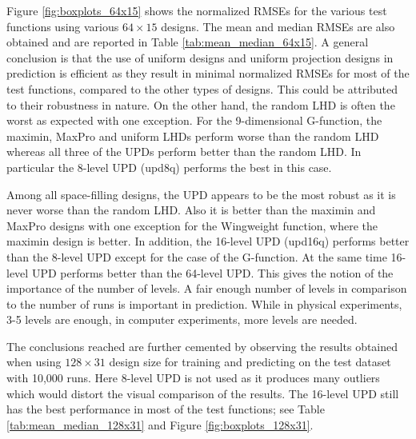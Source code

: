 \documentclass [PhD] {package/uclathes}
\begin{document}
Figure \ref{fig:boxplots_64x15} shows the normalized RMSEs for the various test functions using various $64\times15$ designs. The mean and median RMSEs are also obtained and are reported in Table \ref{tab:mean_median_64x15}.
A general conclusion is that the use of uniform designs and uniform projection designs in prediction is efficient as they result in minimal normalized RMSEs for most of the test functions, compared to the other types of designs. This could be attributed to their robustness in nature. On the other hand, the random LHD is often the worst as expected with one exception. For the 9-dimensional G-function, the maximin, MaxPro and uniform LHDs perform worse than the random LHD whereas all three of the UPDs perform better than the random LHD. In particular the 8-level UPD  (upd8q) performs the best in this case.

Among all space-filling designs, the UPD appears to be the most robust as it is never worse than the random LHD. Also it is better than the maximin and  MaxPro designs with one exception for the Wingweight function, where the maximin design is better. In addition, the 16-level UPD (upd16q) performs better than the 8-level UPD except for the case of the G-function. At the same time 16-level UPD performs better than the 64-level UPD. This gives the notion of the importance of the number of levels. A fair enough number of levels in comparison to the number of runs is important in prediction. While in physical experiments, 3-5 levels are enough, in computer experiments, more levels are needed.

The conclusions reached are further cemented by observing the results obtained when using $128\times 31$ design size for training and predicting on the test dataset with 10,000 runs. Here 8-level UPD is not used as it produces many outliers which would distort the visual comparison of the results. The 16-level UPD still has the best performance in most of the test functions; see Table \ref{tab:mean_median_128x31} and Figure \ref{fig:boxplots_128x31}.
\end{document}
